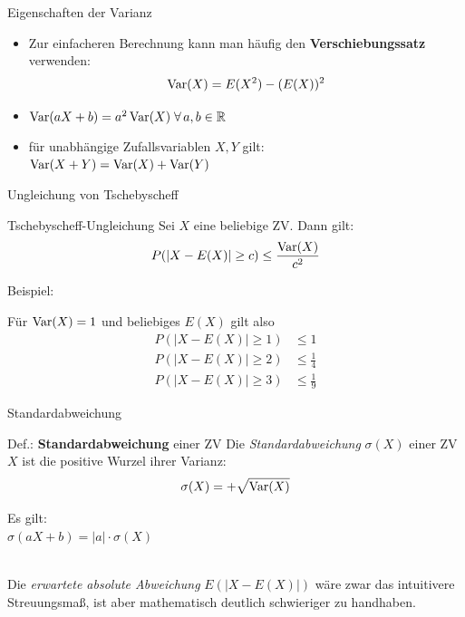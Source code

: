 \documentclass[
  10pt,
  ignorenonframetext,
]{beamer}
\providecommand{\tightlist}{%
  \setlength{\itemsep}{0pt}\setlength{\parskip}{0pt}}
\begin{document}
\begin{frame}{Eigenschaften der Varianz}
\protect\hypertarget{eigenschaften-der-varianz}{}
\begin{itemize}
\tightlist
\item
  Zur einfacheren Berechnung kann man häufig den
  \textbf{Verschiebungssatz} verwenden: \[\operatorname{Var}(X) = E(X^2) -(E(X))^2\]
\item
  \(\operatorname{Var}(aX + b) = a^2 \operatorname{Var}(X) \;\forall\, a,b\in \mathbb{R}\)
\item
  für unabhängige Zufallsvariablen \(X, Y\) gilt:\\
  \(\operatorname{Var}(X + Y) = \operatorname{Var}(X) + \operatorname{Var}(Y)\)
\end{itemize}
\end{frame}

\begin{frame}{Ungleichung von Tschebyscheff}
\protect\hypertarget{ungleichung-von-tschebyscheff}{}
\begin{block}{Tschebyscheff-Ungleichung}
\protect\hypertarget{tschebyscheff-ungleichung}{}
Sei \(X\) eine beliebige ZV. Dann gilt: \[
P(|X - E(X)| \geq c) \leq \frac{\operatorname{Var}(X)}{c^2}
\]
\end{block}

Beispiel:

Für \(\operatorname{Var}(X)=1\) und beliebiges \(E(X)\) gilt also \begin{align*}
P(|X - E(X)| \geq 1) &\leq  1 \\
P(|X - E(X)| \geq 2) &\leq  \frac{1}{4} \\
P(|X - E(X)| \geq 3) &\leq  \frac{1}{9}
\end{align*}
\end{frame}

\begin{frame}{Standardabweichung}
\protect\hypertarget{standardabweichung}{}
\begin{block}{Def.: \textbf{Standardabweichung} einer ZV}
\protect\hypertarget{def.-standardabweichung-einer-zv}{}
Die \emph{Standardabweichung} \(\sigma(X)\) einer ZV \(X\) ist die
positive Wurzel ihrer Varianz: \[
\sigma(X) = + \sqrt{\operatorname{Var}(X)}
\]
\end{block}

Es gilt:\\
\(\sigma(aX + b) = |a| \cdot \sigma(X)\)\\
\strut \\

Die \emph{erwartete absolute Abweichung} \(E(|X - E(X)|)\) wäre zwar das
intuitivere Streuungsmaß, ist aber mathematisch deutlich schwieriger zu
handhaben.

\end{frame}
\end{document}
